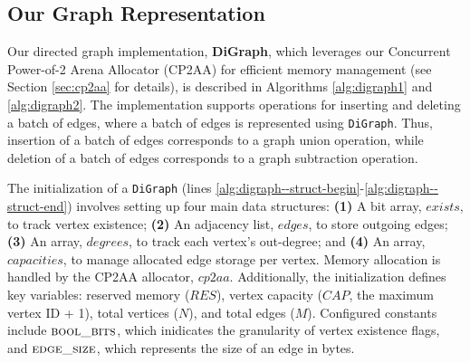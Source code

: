 \subsection{Our Graph Representation}
\label{sec:digraph}

Our directed graph implementation, \textbf{DiGraph}, which leverages our Concurrent Power-of-2 Arena Allocator (CP2AA) for efficient memory management (see Section \ref{sec:cp2aa} for details), is described in Algorithms \ref{alg:digraph1} and \ref{alg:digraph2}. The implementation supports operations for inserting and deleting a batch of edges, where a batch of edges is represented using \texttt{DiGraph}. Thus, insertion of a batch of edges corresponds to a graph union operation, while deletion of a batch of edges corresponds to a graph subtraction operation.

The initialization of a \texttt{DiGraph} (lines \ref{alg:digraph--struct-begin}-\ref{alg:digraph--struct-end}) involves setting up four main data structures: \textbf{(1)} A bit array, $exists$, to track vertex existence; \textbf{(2)} An adjacency list, $edges$, to store outgoing edges; \textbf{(3)} An array, $degrees$, to track each vertex's out-degree; and \textbf{(4)} An array, $capacities$, to manage allocated edge storage per vertex. Memory allocation is handled by the CP2AA allocator, $cp2aa$. Additionally, the initialization defines key variables: reserved memory ($RES$), vertex capacity ($CAP$, the maximum vertex ID + 1), total vertices ($N$), and total edges ($M$). Configured constants include $\textsc{bool\_bits}$, which inidicates the granularity of vertex existence flags, and $\textsc{edge\_size}$, which represents the size of an edge in bytes.

